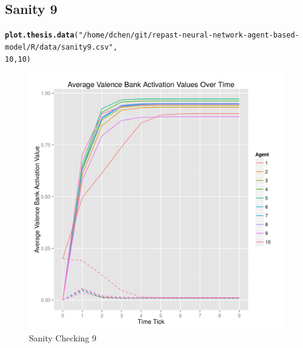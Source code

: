 \documentclass{article}\usepackage[]{graphicx}\usepackage[]{color}
\makeatletter
\def\maxwidth{ %
  \ifdim\Gin@nat@width>\linewidth
    \linewidth
  \else
    \Gin@nat@width
  \fi
}
\newcommand{\hlnum}[1]{\textcolor[rgb]{0.686,0.059,0.569}{#1}}%
\newcommand{\hlstr}[1]{\textcolor[rgb]{0.192,0.494,0.8}{#1}}%
\newcommand{\hlstd}[1]{\textcolor[rgb]{0.345,0.345,0.345}{#1}}%
\newcommand{\hlkwd}[1]{\textcolor[rgb]{0.737,0.353,0.396}{\textbf{#1}}}%
\newenvironment{kframe}{%
 \def\at@end@of@kframe{}%
 \ifinner\ifhmode%
  \def\at@end@of@kframe{\end{minipage}}%
  \begin{minipage}{\columnwidth}%
 \fi\fi%
 \def\FrameCommand##1{\hskip\@totalleftmargin \hskip-\fboxsep
 \colorbox{shadecolor}{##1}\hskip-\fboxsep
     \hskip-\linewidth \hskip-\@totalleftmargin \hskip\columnwidth}%
 \MakeFramed {\advance\hsize-\width
   \@totalleftmargin\z@ \linewidth\hsize
   \@setminipage}}%
 {\par\unskip\endMakeFramed%
 \at@end@of@kframe}
\newenvironment{knitrout}{}{} %
\makeatother
\begin{document}
\subsection{Sanity 9}
\begin{knitrout}
\color{fgcolor}\begin{kframe}
\begin{alltt}
\hlkwd{plot.thesis.data}\hlstd{(}\hlstr{"/home/dchen/git/repast-neural-network-agent-based-model/R/data/sanity9.csv"}\hlstd{,}
    \hlnum{10}\hlstd{,} \hlnum{10}\hlstd{)}
\end{alltt}
\end{kframe}\begin{figure}[]

\includegraphics[width=\maxwidth]{figure/plot-sanity-9} \caption[Sanity Checking 9]{Sanity Checking 9\label{fig:plot-sanity-9}}
\end{figure}


\end{knitrout}


\newpage
\end{document}
